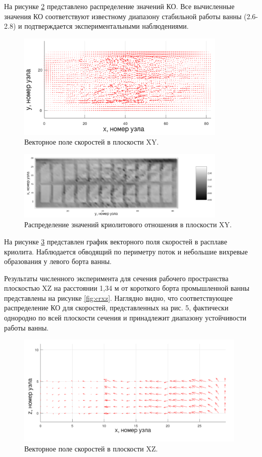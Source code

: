 \documentclass[pdflatex,sn-mathphys-gost]{pmi-jnl}
\begin{document}
На рисунке \ref{fig:crxy} представлено распределение значений КО. Все вычисленные значения КО соответствуют известному диапазону стабильной работы ванны (2.6-2.8) и подтверждается экспериментальными наблюдениями. 

\begin{figure}[ht]
    \centering
    \includegraphics[width=100mm]{veloxy_art.png}
    \caption{Векторное поле скоростей в плоскости XY.}
    \label{fig:veloxy} 
\end{figure}

\begin{figure}[ht]
    \centering
    \includegraphics[width=100mm]{crxy_art.png}
    \caption{Распределение значений криолитового отношения в плоскости XY.}
    \label{fig:crxy} 
\end{figure}

На рисунке \ref{fig:veloxz} представлен график векторного поля скоростей в расплаве криолита. Наблюдается обводящий по периметру поток и небольшие вихревые образования у левого борта ванны.

Результаты численного эксперимента для сечения рабочего пространства плоскостью XZ на расстоянии 1,34 м от короткого борта промышленной ванны представлены на рисунке \ref{fig:crxz}. Наглядно видно, что соответствующее распределение КО для скоростей, представленных на рис. 5, фактически однородно по всей плоскости сечения и принадлежит диапазону устойчивости работы ванны. 

\begin{figure}[ht]
    \centering
    \includegraphics[width=110mm]{veloxz_art.png}
    \caption{Векторное поле скоростей в плоскости XZ.}
    \label{fig:veloxz} 
\end{figure}
\end{document}
